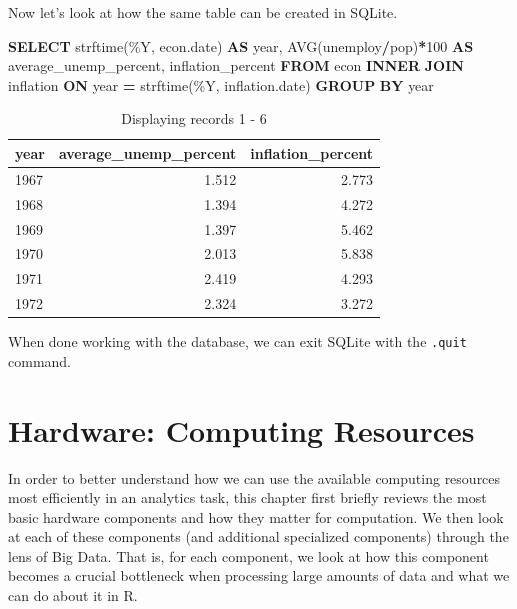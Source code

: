 \documentclass[
  12pt,
]{style/krantz}
\newenvironment{Shaded}{\begin{snugshade}}{\end{snugshade}}
\newcommand{\DataTypeTok}[1]{\textcolor[rgb]{0.13,0.29,0.53}{#1}}
\newcommand{\DecValTok}[1]{\textcolor[rgb]{0.00,0.00,0.81}{#1}}
\newcommand{\FunctionTok}[1]{\textcolor[rgb]{0.00,0.00,0.00}{#1}}
\newcommand{\KeywordTok}[1]{\textcolor[rgb]{0.13,0.29,0.53}{\textbf{#1}}}
\newcommand{\NormalTok}[1]{#1}
\newcommand{\OperatorTok}[1]{\textcolor[rgb]{0.81,0.36,0.00}{\textbf{#1}}}
\newcommand{\StringTok}[1]{\textcolor[rgb]{0.31,0.60,0.02}{#1}}
\begin{document}
Now let's look at how the same table can be created in SQLite.

\begin{Shaded}
\begin{Highlighting}[]
\KeywordTok{SELECT} 
\NormalTok{strftime(}\StringTok{\textquotesingle{}\%Y\textquotesingle{}}\NormalTok{, econ.}\DataTypeTok{date}\NormalTok{)  }\KeywordTok{AS} \DataTypeTok{year}\NormalTok{,}
\FunctionTok{AVG}\NormalTok{(unemploy}\OperatorTok{/}\NormalTok{pop)}\OperatorTok{*}\DecValTok{100} \KeywordTok{AS}\NormalTok{ average\_unemp\_percent,}
\NormalTok{inflation\_percent}
\KeywordTok{FROM}\NormalTok{ econ }\KeywordTok{INNER} \KeywordTok{JOIN}\NormalTok{ inflation }\KeywordTok{ON} \DataTypeTok{year} \OperatorTok{=}\NormalTok{ strftime(}\StringTok{\textquotesingle{}\%Y\textquotesingle{}}\NormalTok{, inflation.}\DataTypeTok{date}\NormalTok{)}
\KeywordTok{GROUP} \KeywordTok{BY} \DataTypeTok{year}
\end{Highlighting}
\end{Shaded}

\begin{table}

\caption{\label{tab:unnamed-chunk-66}Displaying records 1 - 6}
\centering
\begin{tabular}[t]{l|r|r}
\hline
year & average\_unemp\_percent & inflation\_percent\\
\hline
1967 & 1.512 & 2.773\\
\hline
1968 & 1.394 & 4.272\\
\hline
1969 & 1.397 & 5.462\\
\hline
1970 & 2.013 & 5.838\\
\hline
1971 & 2.419 & 4.293\\
\hline
1972 & 2.324 & 3.272\\
\hline
\end{tabular}
\end{table}

When done working with the database, we can exit SQLite with the \texttt{.quit} command.

\hypertarget{hardware-computing-resources}{%
\chapter{Hardware: Computing Resources}\label{hardware-computing-resources}}

In order to better understand how we can use the available computing resources most efficiently in an analytics task, this chapter first briefly reviews the most basic hardware components and how they matter for computation. We then look at each of these components (and additional specialized components) through the lens of Big Data. That is, for each component, we look at how this component becomes a crucial bottleneck when processing large amounts of data and what we can do about it in R.
\end{document}
